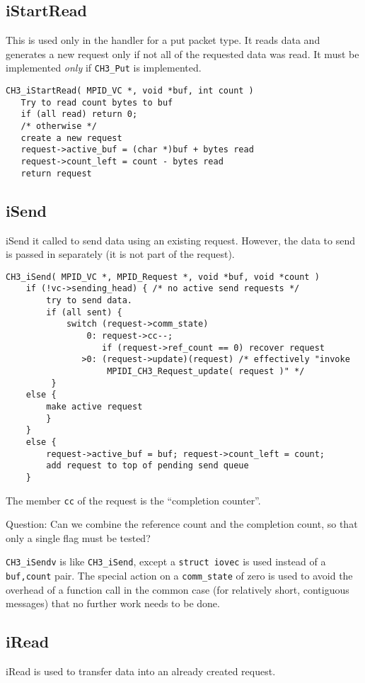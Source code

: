 \documentclass{article}
\def\code{\begingroup\makeustext\eatcode}
\def\eatcode#1{\texttt{#1}\endgroup}
\begin{document}
\subsection{iStartRead}
This is used only in the handler for a put packet type.  It reads data and
generates a new request only if not all of the requested data was
read.
It must be implemented \emph{only} if \code{CH3_Put} is implemented.

\begin{verbatim}
CH3_iStartRead( MPID_VC *, void *buf, int count )
   Try to read count bytes to buf
   if (all read) return 0;
   /* otherwise */
   create a new request
   request->active_buf = (char *)buf + bytes read
   request->count_left = count - bytes read
   return request
\end{verbatim}

\subsection{iSend}
iSend it called to send data using an existing request.  However, the data to
send is passed in separately (it is not part of the request).
\begin{verbatim}
CH3_iSend( MPID_VC *, MPID_Request *, void *buf, void *count )
    if (!vc->sending_head) { /* no active send requests */
        try to send data.
        if (all sent) {
            switch (request->comm_state)
                0: request->cc--; 
                   if (request->ref_count == 0) recover request
               >0: (request->update)(request) /* effectively "invoke 
                    MPIDI_CH3_Request_update( request )" */
         }
    else {
        make active request
        }
    }
    else {
        request->active_buf = buf; request->count_left = count;
        add request to top of pending send queue
    }
\end{verbatim}
The member \code{cc} of the request is the ``completion counter''.

Question: Can we combine the reference count and the completion count,
so that only a single flag must be tested?

\code{CH3_iSendv} is like \code{CH3_iSend}, except a \code{struct iovec} is
used instead of a \code{buf,count} pair.  The special action on a
\code{comm_state} of zero is used to avoid the overhead of a function
call in the common case (for relatively short, contiguous messages)
that no further work needs to be done.

\subsection{iRead}
iRead is used to transfer data into an already created request.  
\end{document}

